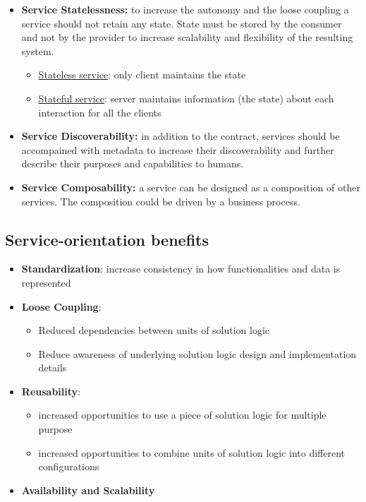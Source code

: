 \documentclass[10pt,a4paper]{article}
\begin{document}
\begin{itemize}
\begin{itemize}
	\end{itemize}
	\item \textbf{Service Statelessness:} to increase the autonomy and the loose coupling a service should not retain any state. State must be stored by the consumer and not by the provider to increase scalability and flexibility of the resulting system.
	\begin{itemize}
		\item \uline{Stateless service}: only client maintains the state
		\item \uline{Stateful service}: server maintains information (the state) about each interaction for all the clients
	\end{itemize}
	\item \textbf{Service Discoverability:} in addition to the contract, services should be accompained with metadata to increase their discoverability and further describe their purposes and capabilities to humans.
	\item \textbf{Service Composability:} a service can be designed as a composition of other services. The composition could be driven by a business process.
\end{itemize}
\subsection{Service-orientation benefits}
\begin{itemize}
	\item \textbf{Standardization}: increase consistency in how functionalities and data is represented
	\item \textbf{Loose Coupling}:
	\begin{itemize}
		\item Reduced dependencies between units of solution logic
		\item Reduce awareness of underlying solution logic design and implementation details	
	\end{itemize} 
	\item \textbf{Reusability}: 
	\begin{itemize}
		\item increased opportunities to use a piece of solution logic for multiple purpose
		\item increased opportunities to combine units of solution logic into different configurations
	\end{itemize}
	\item \textbf{Availability and Scalability}
\end{itemize}
\pagebreak
\end{document}
